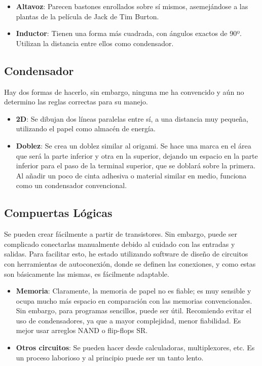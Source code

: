 \documentclass[]{article}
\begin{document}
\begin{itemize}
    \item \textbf{Altavoz}: Parecen bastones enrollados sobre sí mismos, asemejándose a las plantas de la película de Jack
    de Tim Burton.
    \item \textbf{Inductor}: Tienen una forma más cuadrada, con ángulos exactos de 90º. Utilizan la distancia entre ellos 
    como condensador.
\end{itemize}

\subsection{Condensador}
Hay dos formas de hacerlo, sin embargo, ninguna me ha convencido y aún no determino las reglas correctas para su manejo.

\begin{itemize}
    \item \textbf{2D}: Se dibujan dos líneas paralelas entre sí, a una distancia muy pequeña, utilizando el papel como
    almacén de energía.
    \item \textbf{Doblez}: Se crea un doblez similar al origami. Se hace una marca en el área que será la parte inferior
    y otra en la superior, dejando un espacio en la parte inferior para el paso de la terminal superior, que se doblará 
    sobre la primera. Al añadir un poco de cinta adhesiva o material similar en medio, funciona como un condensador convencional.
\end{itemize}

\subsection{Compuertas Lógicas}
    Se pueden crear fácilmente a partir de transistores. Sin embargo, puede ser complicado conectarlas manualmente debido al cuidado
    con las entradas y salidas. Para facilitar esto, he estado utilizando software de diseño de circuitos con herramientas de
    autoconexión, donde se definen las conexiones, y como estas son básicamente las mismas, es fácilmente adaptable.

\begin{itemize}
    \item \textbf{Memoria}: Claramente, la memoria de papel no es fiable; es muy sensible y ocupa mucho más espacio
     en comparación con las memorias convencionales. Sin embargo, para programas sencillos, puede ser útil. Recomiendo
    evitar el uso de condensadores, ya que a mayor complejidad, menor fiabilidad. Es mejor usar arreglos NAND o flip-flops SR.
    \item \textbf{Otros circuitos}: Se pueden hacer desde calculadoras, multiplexores, etc. Es un proceso laborioso
    y al principio puede ser un tanto lento.
\end{itemize}
\end{document}
